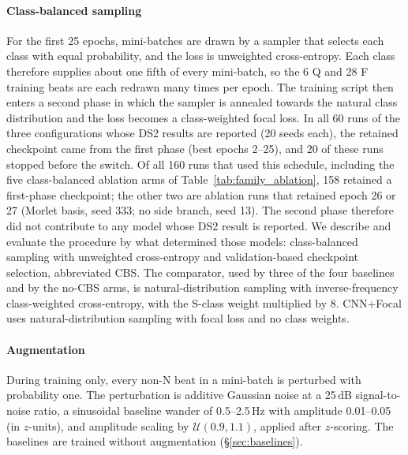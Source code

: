 \documentclass[preprint,12pt]{elsarticle}
\begin{document}
\paragraph{Class-balanced sampling} For the first 25 epochs, mini-batches are drawn by a sampler that selects each class with equal probability, and the loss is unweighted cross-entropy. Each class therefore supplies about one fifth of every mini-batch, so the 6 Q and 28 F training beats are each redrawn many times per epoch. The training script then enters a second phase in which the sampler is annealed towards the natural class distribution and the loss becomes a class-weighted focal loss. In all 60 runs of the three configurations whose DS2 results are reported (20 seeds each), the retained checkpoint came from the first phase (best epochs 2--25), and 20 of these runs stopped before the switch. Of all 160 runs that used this schedule, including the five class-balanced ablation arms of Table~\ref{tab:family_ablation}, 158 retained a first-phase checkpoint; the other two are ablation runs that retained epoch 26 or 27 (Morlet basis, seed 333; no side branch, seed 13). The second phase therefore did not contribute to any model whose DS2 result is reported. We describe and evaluate the procedure by what determined those models: class-balanced sampling with unweighted cross-entropy and validation-based checkpoint selection, abbreviated CBS. The comparator, used by three of the four baselines and by the no-CBS arms, is natural-distribution sampling with inverse-frequency class-weighted cross-entropy, with the S-class weight multiplied by 8. CNN+Focal uses natural-distribution sampling with focal loss and no class weights.

\paragraph{Augmentation} During training only, every non-N beat in a mini-batch is perturbed with probability one. The perturbation is additive Gaussian noise at a 25\,dB signal-to-noise ratio, a sinusoidal baseline wander of 0.5--2.5\,Hz with amplitude 0.01--0.05 (in $z$-units), and amplitude scaling by $\mathcal{U}(0.9, 1.1)$, applied after $z$-scoring. The baselines are trained without augmentation (\S\ref{sec:baselines}).
\end{document}
